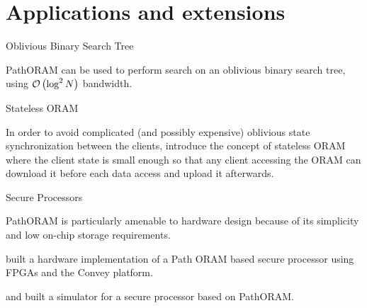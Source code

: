 
\section{Applications and extensions}

	\begin{frame}{Oblivious Binary Search Tree}
		
		PathORAM can be used to perform search on an oblivious binary search tree, using $\mathcal{O}\left(\log^2 N\right)$ bandwidth.~\cite{Gentry:2013}

	\end{frame}

	\begin{frame}{Stateless ORAM}
		
		In order to avoid complicated (and possibly expensive) oblivious state synchronization between the clients, \citeauthor{DBLP:journals/corr/abs-1105-4125} introduce the concept of stateless ORAM~\cite{DBLP:journals/corr/abs-1105-4125} where the client state is small enough so that any client accessing the ORAM can download it before each data access and upload it afterwards.

	\end{frame}

	\begin{frame}{Secure Processors}
		
		PathORAM is particularly amenable to hardware design because of its simplicity and low on-chip storage requirements.

		\textcite{Maas:EECS-2014-89} built a hardware implementation of a Path ORAM based secure processor using FPGAs and the Convey platform. %

		\textcite{Fletcher:2012:SPA:2382536.2382540, fletcher2013ascend} and \textcite{ren2013design} built a simulator for a secure processor based on PathORAM\@.

	\end{frame}


